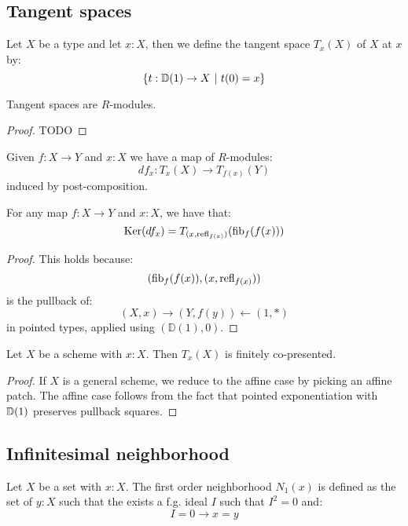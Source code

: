 \subsection{Tangent spaces}

\begin{definition}
Let $X$ be a type and let $x:X$, then we define the tangent space $T_x(X)$ of $X$ at $x$ by:
\[\{t:\D(1)\to X\ |\ t(0)=x\}\]
\end{definition}

\begin{lemma}
Tangent spaces are $R$-modules.
\end{lemma}

\begin{proof}
TODO
\end{proof}

\begin{definition}
Given $f:X\to Y$ and $x:X$ we have a map of $R$-modules:
\[df_x : T_x(X)\to T_{f(x)}(Y)\]
induced by post-composition.
\end{definition}

\begin{lemma}
\label{kernel-is-tangent-of-fibers}
For any map $f:X\to Y$ and $x:X$, we have that:
\[
\mathrm{Ker}(df_x) = T_{(x,\mathrm{refl}_{f(x)})}(\mathrm{fib}_f(f(x)))
\]
\end{lemma}

\begin{proof}
This holds because:
\[
(\mathrm{fib}_f(f(x)),(x,\mathrm{refl}_{f(x)}))
\]
is the pullback of:
\[
(X,x) \to (Y,f(y)) \leftarrow (1,*)
\]
in pointed types, applied using $(\mathbb{D}(1),0)$.
\end{proof}

\begin{lemma}
Let $X$ be a scheme with $x : X$. Then $T_x(X)$ is finitely
co-presented.
\end{lemma}

\begin{proof}
If $X$ is a general scheme, we reduce to the affine case by picking an affine patch.
The affine case follows from the fact that pointed exponentiation with $\mathbb{D}(1)$
preserves pullback squares.
\end{proof}



\subsection{Infinitesimal neighborhood}

\begin{definition}
Let $X$ be a set with $x:X$. The first order neighborhood $N_1(x)$ is defined as the set of $y:X$ such that the exists a f.g. ideal $I$ such that $I^{2}=0$ and:
\[I=0 \to x=y\]
\end{definition}

